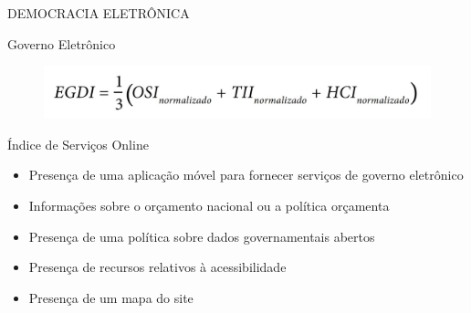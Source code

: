 \documentclass{Alexandre}
\begin{document}
\begin{frame}{DEMOCRACIA ELETRÔNICA}

    \begin{center}
        Governo Eletrônico
    \end{center}
    \begin{figure}
        \includegraphics[scale = 0.30]{Figuras/EGDI.jpg}
    \end{figure}

\end{frame}


\begin{frame}{Índice de Serviços Online}

    \begin{itemize}
        \item Presença de uma aplicação móvel para fornecer serviços de governo eletrônico
        \item Informações sobre o orçamento nacional ou a política orçamenta
        \item Presença de uma política sobre dados governamentais abertos
        \item Presença de recursos relativos à acessibilidade
        \item Presença de um mapa do site
    \end{itemize}

\end{frame}
\end{document}
